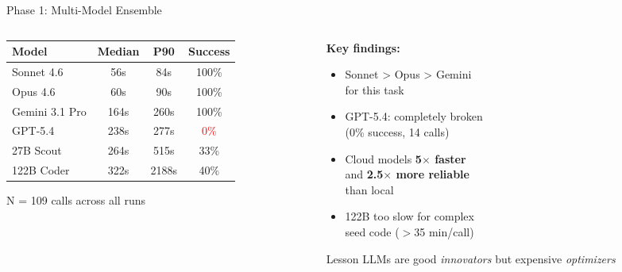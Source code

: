 \documentclass[aspectratio=169,12pt]{beamer}
\begin{document}
\begin{frame}{Phase 1: Multi-Model Ensemble}
  \begin{columns}[T]
    \begin{column}{0.52\textwidth}
      {\small
      \begin{table}
        \centering
        \begin{tabular}{@{}lccc@{}}
          \toprule
          Model & Median & P90 & Success \\
          \midrule
          Sonnet 4.6 & 56s & 84s & \alert{100\%} \\
          Opus 4.6 & 60s & 90s & 100\% \\
          Gemini 3.1 Pro & 164s & 260s & 100\% \\
          GPT-5.4 & 238s & 277s & \textcolor{red}{0\%} \\
          \rowcolor{cbBlue!10}
          27B Scout & 264s & 515s & 33\% \\
          \rowcolor{cbBlue!10}
          122B Coder & 322s & 2188s & 40\% \\
          \bottomrule
        \end{tabular}
      \end{table}
      }
      {\scriptsize N = 109 calls across all runs}
    \end{column}
    \begin{column}{0.45\textwidth}
      \textbf{Key findings:}
      \begin{itemize}
        \item \alert{Sonnet > Opus > Gemini}\\
              for this task
        \item GPT-5.4: completely broken\\
              (0\% success, 14 calls)
        \item Cloud models \textbf{5$\times$ faster}\\
              and \textbf{2.5$\times$ more reliable}\\
              than local
        \item 122B too slow for complex\\
              seed code ($>$35 min/call)
      \end{itemize}

      \vspace{0.3em}
      \begin{alertblock}{Lesson}
        LLMs are good \emph{innovators} but expensive \emph{optimizers}
      \end{alertblock}
    \end{column}
  \end{columns}
\end{frame}
\end{document}
